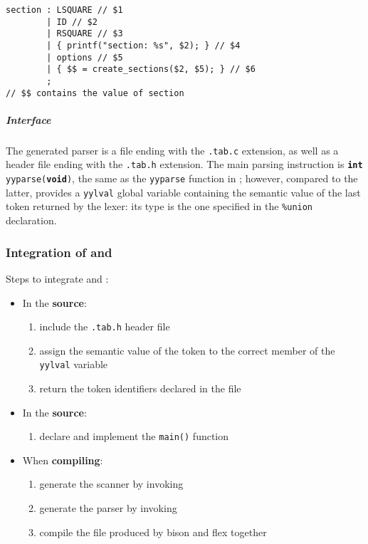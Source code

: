 \documentclass[english]{article}
\begin{document}
\begin{onepage}
  \begin{lstlisting}[language=LANCE, caption={Semantic value usage}, label={lst:bison-semantic-value-usage}]
section : LSQUARE // $1
        | ID // $2
        | RSQUARE // $3
        | { printf("section: %s", $2); } // $4
        | options // $5
        | { $$ = create_sections($2, $5); } // $6
        ;
// $$ contains the value of section
\end{lstlisting}
\end{onepage}

\subparagraph*{Interface}

The generated parser is a \clang file ending with the \texttt{.tab.c} extension, as well as a header file ending with the \texttt{.tab.h} extension.
The main parsing instruction is \texttt{\textbf{int} yyparse(\textbf{void})}, the same as the \texttt{yyparse} function in \flex;
however, compared to the latter, \bison provides a \texttt{yylval} global variable containing the semantic value of the last token returned by the lexer:
its type is the one specified in the \texttt{\%union} declaration.

\subsubsection{Integration of \flex and \bison}

Steps to integrate \flex and \bison:

\begin{itemize}
  \item In the \textbf{\flex source}:
        \begin{enumerate}[series=flex-bison-enum, label=step \arabic*., ref=(step \arabic*), leftmargin=*, labelindent=2em, widest*=6]
          \item include the \texttt{.tab.h} header file
          \item assign the semantic value of the token to the correct member of the \texttt{yylval} variable
          \item return the token identifiers declared in the \bison file
        \end{enumerate}
  \item In the \textbf{\bison source}:
        \begin{enumerate}[resume*=flex-bison-enum]
          \item declare and implement the \texttt{main()} function
        \end{enumerate}
  \item When \textbf{compiling}:
        \begin{enumerate}[resume*=flex-bison-enum]
          \item\label{enum:flex-bison-command-1} generate the \flex scanner by invoking \flex
          \item\label{enum:flex-bison-command-2} generate the \bison parser by invoking \bison
          \item\label{enum:flex-bison-command-3} compile the \clang file produced by bison and flex together
        \end{enumerate}
\end{itemize}
\end{document}
